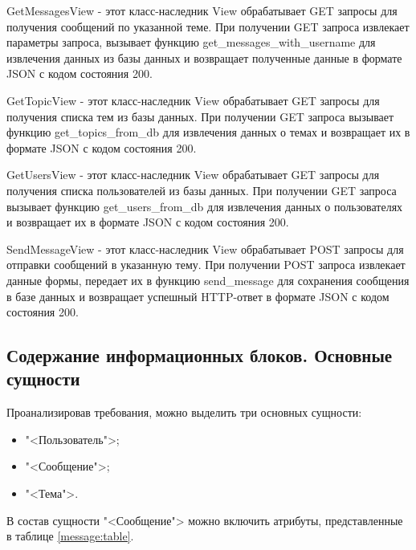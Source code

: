 GetMessagesView - этот класс-наследник View обрабатывает GET запросы для получения сообщений по указанной теме. При получении GET запроса извлекает параметры запроса, вызывает функцию get\_messages\_with\_username для извлечения данных из базы данных и возвращает полученные данные в формате JSON с кодом состояния 200.

GetTopicView - этот класс-наследник View обрабатывает GET запросы для получения списка тем из базы данных. При получении GET запроса вызывает функцию get\_topics\_from\_db для извлечения данных о темах и возвращает их в формате JSON с кодом состояния 200.

GetUsersView - этот класс-наследник View обрабатывает GET запросы для получения списка пользователей из базы данных. При получении GET запроса вызывает функцию get\_users\_from\_db для извлечения данных о пользователях и возвращает их в формате JSON с кодом состояния 200.

SendMessageView - этот класс-наследник View обрабатывает POST запросы для отправки сообщений в указанную тему. При получении POST запроса извлекает данные формы, передает их в функцию send\_message для сохранения сообщения в базе данных и возвращает успешный HTTP-ответ в формате JSON с кодом состояния 200.




\subsection{Содержание информационных блоков. Основные сущности}











Проанализировав требования, можно выделить три основных сущности:
\begin{itemize}
\item "<Пользователь">;
\item "<Сообщение">;
\item "<Тема">.
\end{itemize}

В состав сущности "<Сообщение"> можно включить атрибуты, представленные в таблице \ref{message:table}.

